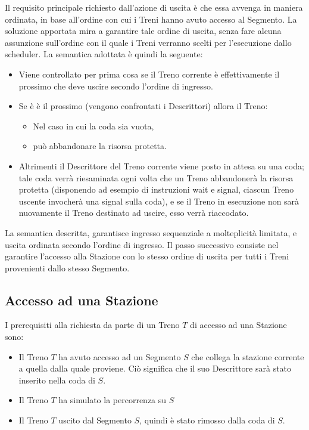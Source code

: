 \begin{description}
			Il requisito principale richiesto dall'azione di uscita è che essa avvenga in maniera ordinata, in base all'ordine con cui i Treni hanno avuto accesso al Segmento. La soluzione apportata mira a garantire tale ordine di uscita, senza fare alcuna assunzione sull'ordine con il quale i Treni verranno scelti per l'esecuzione dallo scheduler. La semantica adottata è quindi la seguente:
			\begin{itemize}
				 \item Viene controllato per prima cosa se il Treno corrente è effettivamente il prossimo che deve uscire secondo l'ordine di ingresso.
				 \item Se è è il prossimo (vengono confrontati i Descrittori) allora il Treno:
				 	\begin{itemize} 
				 		\item Nel caso in cui la coda sia vuota, 
				 		\item può abbandonare la risorsa protetta.
				 	\end{itemize} 
				 \item Altrimenti il Descrittore del Treno corrente viene posto in attesa su una coda; tale coda verrà riesaminata ogni volta che un Treno abbandonerà la risorsa protetta (disponendo ad esempio di instruzioni wait e signal, ciascun Treno uscente invocherà una signal sulla coda), e se il Treno in esecuzione non sarà nuovamente il Treno destinato ad uscire, esso verrà riaccodato. 
			\end{itemize}
		\end {description}  
	
	La semantica descritta, garantisce ingresso sequenziale a molteplicità limitata, e uscita ordinata secondo l'ordine di ingresso. Il passo successivo consiste nel garantire l'accesso alla Stazione con lo stesso ordine di uscita per tutti i Treni provenienti dallo stesso Segmento.
	
		\subsection{Accesso ad una Stazione}
		
		I prerequisiti alla richiesta da parte di un Treno $T$ di accesso ad una Stazione sono:
		
			\begin{itemize}
				\item Il Treno $T$ ha avuto accesso ad un Segmento $S$ che collega la stazione corrente a quella dalla quale proviene. Ciò significa che il suo Descrittore sarà stato inserito nella coda  di $ S $.
				\item Il Treno $T$ ha simulato la percorrenza su $S$ 
				\item Il Treno $T$ uscito dal Segmento $S$, quindi è stato rimosso dalla coda  di $S$.
			\end{itemize}
			
